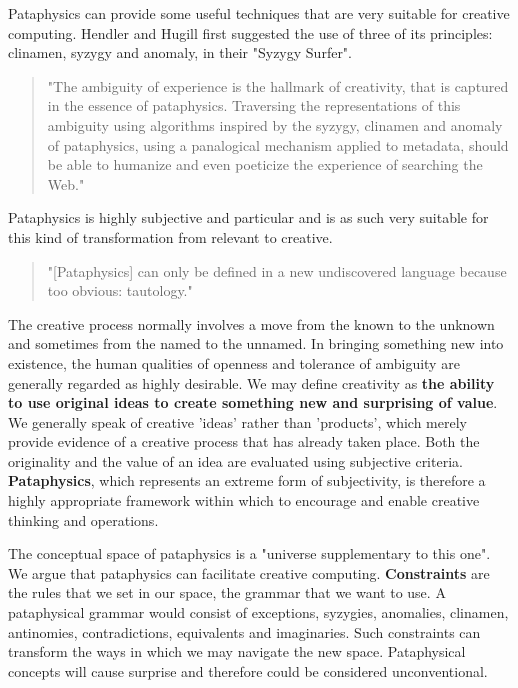 Pataphysics can provide some useful techniques that are very suitable for creative computing. Hendler and Hugill first suggested the use of three of its principles: clinamen, syzygy and anomaly, in their "Syzygy Surfer".

\begin{quote}
  "The ambiguity of experience is the hallmark of creativity, that is captured in the essence of pataphysics. Traversing the representations of this ambiguity using algorithms inspired by the syzygy, clinamen and anomaly of pataphysics, using a panalogical mechanism applied to metadata, should be able to humanize and even poeticize the experience of searching the Web." \citep{Hendler2013}
\end{quote}

Pataphysics is highly subjective and particular and is as such very suitable for this kind of transformation from relevant to creative.

\begin{quote}
  "[Pataphysics] can only be defined in a new undiscovered language because too obvious: tautology." \citep{Baudrillard2007}
\end{quote}

The creative process normally involves a move from the known to the unknown and sometimes from the named to the unnamed. In bringing something new into existence, the human qualities of openness and tolerance of ambiguity are generally regarded as highly desirable. We may define creativity as \textbf{the ability to use original ideas to create something new and surprising of value}. We generally speak of creative 'ideas' rather than 'products', which merely provide evidence of a creative process that has already taken place. Both the originality and the value of an idea are evaluated using subjective criteria. \textbf{Pataphysics}, which represents an extreme form of subjectivity, is therefore a highly appropriate framework within which to encourage and enable creative thinking and operations.

The conceptual space of pataphysics is a "universe supplementary to this one"\citep[p.21]{Jarry1996}. We argue that pataphysics can facilitate creative computing. \textbf{Constraints} are the rules that we set in our space, the grammar that we want to use. A pataphysical grammar would consist of exceptions, syzygies, anomalies, clinamen, antinomies, contradictions, equivalents and imaginaries. Such constraints can transform the ways in which we may navigate the new space. Pataphysical concepts will cause surprise and therefore could be considered unconventional.

